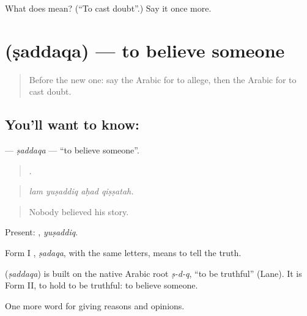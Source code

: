 \begin{tcolorbox}[breakable,colback=teal!4,colframe=teal!35!black,title={Before you move on}]
What does  mean? (\textquotedblleft{}To cast doubt\textquotedblright{}.) Say it once more.
\end{tcolorbox}
\section[\texorpdfstring{\ar{صدق} (ṣaddaqa)}{صدق (ṣaddaqa)}]{ (ṣaddaqa) — to believe someone}

\label{lesson:AR-C366-saddaqa}



\begin{quote}
Before the new one: say the Arabic for to allege, then the Arabic for to cast doubt.
\end{quote}

\subsection*{You'll want to know: }
\textbf{} — \emph{ṣaddaqa} — \textquotedblleft{}to believe someone\textquotedblright{}.

\begin{quote}
   .
\end{quote}

\begin{quote}
\emph{lam yuṣaddiq aḥad qiṣṣatah.}
\end{quote}

\begin{quote}
Nobody believed his story.
\end{quote}

Present: , \emph{yuṣaddiq}.

Form I , \emph{ṣadaqa}, with the same letters, means to tell the truth.

\begin{cousinweb}
\textbf{} (\emph{ṣaddaqa}) is built on the native Arabic root \emph{ṣ-d-q}, \textquotedblleft{}to be truthful\textquotedblright{} (Lane). It is Form II, to hold to be truthful: to believe someone.
\end{cousinweb}

\begin{grammarlens}[title={What you've built}]
One more word for giving reasons and opinions.
\end{grammarlens}


